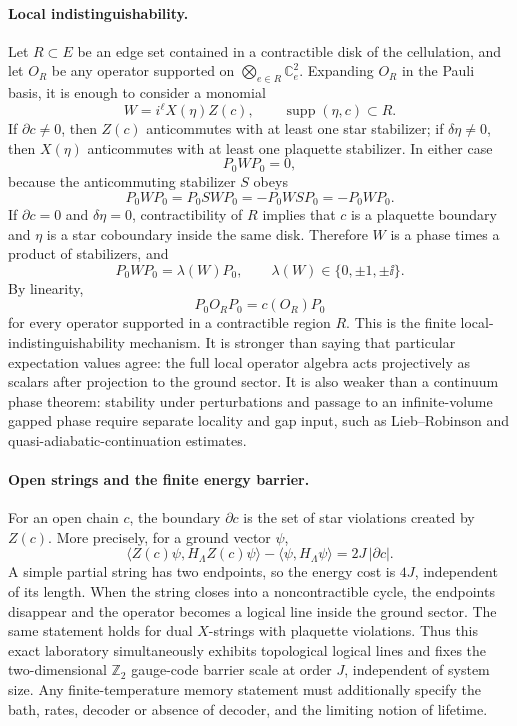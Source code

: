 \paragraph{Local indistinguishability.}
Let \(R\subset E\) be an edge set contained in a contractible disk of the
cellulation, and let \(O_R\) be any operator supported on
\(\bigotimes_{e\in R}\mathbb C^2_e\).  Expanding \(O_R\) in the Pauli basis,
it is enough to consider a monomial
\[
  W=i^\ell X(\eta)Z(c),\qquad \operatorname{supp}(\eta,c)\subset R.
\]
If \(\partial c\neq0\), then \(Z(c)\) anticommutes with at least one star
stabilizer; if \(\delta\eta\neq0\), then \(X(\eta)\) anticommutes with at
least one plaquette stabilizer.  In either case
\[
  P_0 W P_0=0,
\]
because the anticommuting stabilizer \(S\) obeys
\[
  P_0WP_0=P_0SWP_0=-P_0WSP_0=-P_0WP_0 .
\]
If \(\partial c=0\) and \(\delta\eta=0\), contractibility of \(R\) implies
that \(c\) is a plaquette boundary and \(\eta\) is a star coboundary inside
the same disk.  Therefore \(W\) is a phase times a product of stabilizers, and
\[
  P_0 W P_0=\lambda(W)P_0,\qquad \lambda(W)\in\{0,\pm1,\pm\ii\}.
\]
By linearity,
\begin{equation}
  P_0 O_R P_0=c(O_R)P_0
  \label{eq:z2-code-local-indistinguishability}
\end{equation}
for every operator supported in a contractible region \(R\).  This is the
finite local-indistinguishability mechanism.  It is stronger than saying that
particular expectation values agree: the full local operator algebra acts
projectively as scalars after projection to the ground sector.  It is also
weaker than a continuum phase theorem: stability under perturbations and
passage to an infinite-volume gapped phase require separate locality and gap
input, such as Lieb--Robinson and quasi-adiabatic-continuation estimates.

\paragraph{Open strings and the finite energy barrier.}
For an open chain \(c\), the boundary \(\partial c\) is the set of star
violations created by \(Z(c)\).  More precisely, for a ground vector
\(\psi\),
\begin{equation}
  \langle Z(c)\psi,H_\Lambda Z(c)\psi\rangle
  -\langle \psi,H_\Lambda\psi\rangle
  =
  2J\,|\partial c|.
  \label{eq:z2-code-open-string-energy}
\end{equation}
A simple partial string has two endpoints, so the energy cost is \(4J\),
independent of its length.  When the string closes into a noncontractible
cycle, the endpoints disappear and the operator becomes a logical line inside
the ground sector.  The same statement holds for dual \(X\)-strings with
plaquette violations.  Thus this exact laboratory simultaneously exhibits
topological logical lines and fixes the two-dimensional \(\mathbb Z_2\)
gauge-code barrier scale at order \(J\), independent of system size.  Any
finite-temperature memory statement must additionally specify the bath, rates,
decoder or absence of decoder, and the limiting notion of lifetime.

